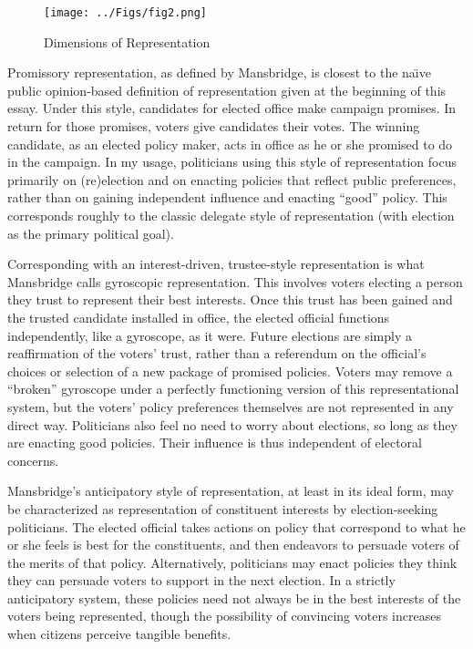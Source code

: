 \begin{figure}[tb]
	\caption{Dimensions of Representation}
	\texttt{[image: ../Figs/fig2.png]}
	\label{fig:2}
\end{figure}

Promissory representation, as defined by Mansbridge, is closest to the na\"{\i}ve public opinion-based definition of representation given at the beginning of this essay. Under this style, candidates for elected office make campaign promises. In return for those promises, voters give candidates their votes. The winning candidate, as an elected policy maker, acts in office as he or she promised to do in the campaign. In my usage, politicians using this style of representation focus primarily on (re)election and on enacting policies that reflect public preferences, rather than on gaining independent influence and enacting ``good'' policy. This corresponds roughly to the classic delegate style of representation (with election as the primary political goal).

Corresponding with an interest-driven, trustee-style representation is what Mansbridge calls gyroscopic representation. This involves voters electing a person they trust to represent their best interests. Once this trust has been gained and the trusted candidate installed in office, the elected official functions independently, like a gyroscope, as it were. Future elections are simply a reaffirmation of the voters' trust, rather than a referendum on the official's choices or selection of a new package of promised policies. Voters may remove a ``broken'' gyroscope under a perfectly functioning version of this representational system, but the voters' policy preferences themselves are not represented in any direct way. Politicians also feel no need to worry about elections, so long as they are enacting good policies. Their influence is thus independent of electoral concerns.

Mansbridge's anticipatory style of representation, at least in its ideal form, may be characterized as representation of constituent interests by election-seeking politicians. The elected official takes actions on policy that correspond to what he or she feels is best for the constituents, and then endeavors to persuade voters of the merits of that policy. Alternatively, politicians may enact policies they think they can persuade voters to support in the next election. In a strictly anticipatory system, these policies need not always be in the best interests of the voters being represented, though the possibility of convincing voters increases when citizens perceive tangible benefits.

